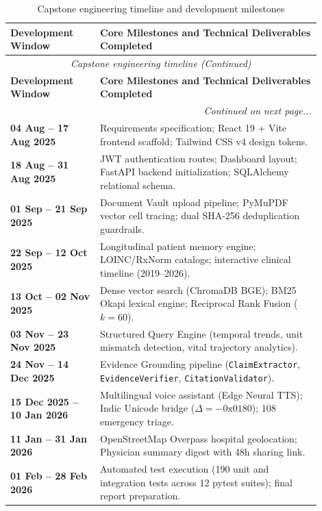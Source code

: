 \small
\begin{longtable}{@{}p{0.26\linewidth} p{0.64\linewidth}@{}}
\caption{Capstone engineering timeline and development milestones}\label{tab:11_1_timeline} \\
\toprule
\textbf{Development Window} & \textbf{Core Milestones and Technical Deliverables Completed} \\
\midrule
\endfirsthead
\toprule
\multicolumn{2}{c}{\small\textit{Capstone engineering timeline (Continued)}} \\[4pt]
\midrule
\textbf{Development Window} & \textbf{Core Milestones and Technical Deliverables Completed} \\
\midrule
\endhead
\midrule
\multicolumn{2}{r}{\footnotesize\textit{Continued on next page...}} \\
\bottomrule
\endfoot
\bottomrule
\endlastfoot
\textbf{04 Aug -- 17 Aug 2025} & Requirements specification; React 19 + Vite frontend scaffold; Tailwind CSS v4 design tokens. \\
\textbf{18 Aug -- 31 Aug 2025} & JWT authentication routes; Dashboard layout; FastAPI backend initialization; SQLAlchemy relational schema. \\
\textbf{01 Sep -- 21 Sep 2025} & Document Vault upload pipeline; PyMuPDF vector cell tracing; dual SHA-256 deduplication guardrails. \\
\textbf{22 Sep -- 12 Oct 2025} & Longitudinal patient memory engine; LOINC/RxNorm catalogs; interactive clinical timeline (2019--2026). \\
\textbf{13 Oct -- 02 Nov 2025} & Dense vector search (ChromaDB BGE); BM25 Okapi lexical engine; Reciprocal Rank Fusion ($k=60$). \\
\textbf{03 Nov -- 23 Nov 2025} & Structured Query Engine (temporal trends, unit mismatch detection, vital trajectory analytics). \\
\textbf{24 Nov -- 14 Dec 2025} & Evidence Grounding pipeline (\texttt{ClaimExtractor}, \texttt{EvidenceVerifier}, \texttt{CitationValidator}). \\
\textbf{15 Dec 2025 -- 10 Jan 2026} & Multilingual voice assistant (Edge Neural TTS); Indic Unicode bridge ($\Delta = -0\text{x}0180$); 108 emergency triage. \\
\textbf{11 Jan -- 31 Jan 2026} & OpenStreetMap Overpass hospital geolocation; Physician summary digest with 48h sharing link. \\
\textbf{01 Feb -- 28 Feb 2026} & Automated test execution (190 unit and integration tests across 12 pytest suites); final report preparation. \\
\bottomrule
\end{longtable}
\normalsize


